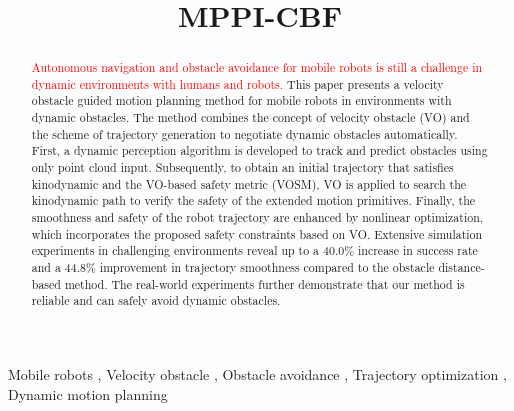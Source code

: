 \documentclass[preprint,5p,times,twocolumn,authoryear]{elsarticle}
\begin{document}
\begin{frontmatter}



\title{MPPI-CBF}

\begin{abstract}
\textcolor{red}{Autonomous navigation and obstacle avoidance for mobile robots is still a challenge in dynamic environments with humans and robots.} This paper presents a velocity obstacle guided motion planning method for mobile robots in environments with dynamic obstacles. The method combines the concept of velocity obstacle (VO) and the scheme of trajectory generation to negotiate dynamic obstacles automatically. First, a dynamic perception algorithm is developed to track and predict obstacles using only point cloud input. Subsequently, to obtain an initial trajectory that satisfies kinodynamic and the VO-based safety metric (VOSM), VO is applied to search the kinodynamic path to verify the safety of the extended motion primitives. Finally, the smoothness and safety of the robot trajectory are enhanced by nonlinear optimization, which incorporates the proposed safety constraints based on VO. Extensive simulation experiments in challenging environments reveal up to a 40.0\% increase in success rate and a 44.8\% improvement in trajectory smoothness compared to the obstacle distance-based method. The real-world experiments further demonstrate that our method is reliable and can safely avoid dynamic obstacles.
\end{abstract}

\begin{keyword}
Mobile robots \sep
Velocity obstacle \sep
Obstacle avoidance \sep
Trajectory optimization \sep
Dynamic motion planning
\end{keyword}

\end{frontmatter}

\end{document}
